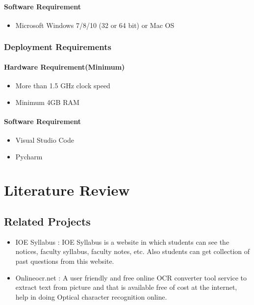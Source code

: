 \subsubsection{Software Requirement}

\begin{itemize}
    \item Microsoft Windows 7/8/10 (32 or 64 bit) or Mac OS

 
\end{itemize}

\subsection{Deployment Requirements}

\subsubsection{Hardware Requirement(Minimum)}
\begin{itemize}
    \item  More than 1.5 GHz clock speed 
    \item  Minimum 4GB RAM
\end{itemize}

\subsubsection{Software Requirement}
\begin{itemize}
    \item  Visual Studio Code
    \item  Pycharm
\end{itemize}


\chapter{Literature Review}
\section{Related Projects}

	\begin{itemize}
	
		\item IOE Syllabus : IOE Syllabus is a website in which students can see the notices, faculty syllabus, faculty 
notes, etc. Also students can get collection of past questions from this website.
			\item Onlineocr.net : A user friendly and free online OCR converter tool service to extract text from picture 
and that is available free of cost at the internet, help in doing Optical character 
recognition online.
		
\end{itemize}
